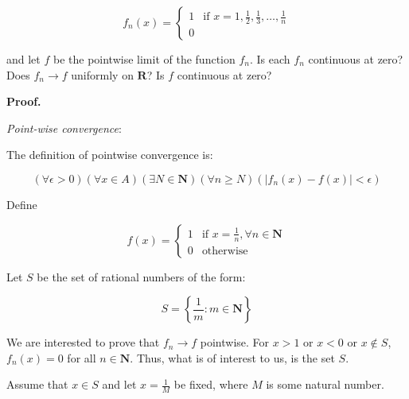 \documentclass[10pt]{article}
\begin{document}
\begin{equation*}
f_{n}( x) =\begin{cases}
1 & \text{if } x=1,\frac{1}{2} ,\frac{1}{3} ,\dotsc ,\frac{1}{n}\\
0 & 
\end{cases}
\end{equation*}


and let $\displaystyle f$ be the pointwise limit of the function $\displaystyle f_{n}$. Is each $\displaystyle f_{n}$ continuous at zero? Does $\displaystyle f_{n}\rightarrow f$ uniformly on $\displaystyle \mathbf{R}$? Is $\displaystyle f$ continuous at zero?



\textbf{Proof.}



\textit{Point-wise convergence}:



The definition of pointwise convergence is:


\begin{equation*}
( \forall \epsilon  >0)( \forall x\in A)( \exists N\in \mathbf{N})( \forall n\geq N)( |f_{n}( x) -f( x) |< \epsilon )
\end{equation*}


Define 


\begin{equation*}
f( x) =\begin{cases}
1 & \text{if } x=\frac{1}{n} ,\forall n\in \mathbf{N}\\
0 & \text{otherwise}
\end{cases}
\end{equation*}


Let $\displaystyle S$ be the set of rational numbers of the form:


\begin{equation*}
S=\left\{\frac{1}{m} :m\in \mathbf{N}\right\}
\end{equation*}


We are interested to prove that $\displaystyle f_{n}\rightarrow f$ pointwise. For $\displaystyle x >1$ or $\displaystyle x< 0$ or $\displaystyle x\notin S$, $\displaystyle f_{n}( x) =0$ for all $\displaystyle n\in \mathbf{N}$. Thus, what is of interest to us, is the set $\displaystyle S$. 



Assume that $\displaystyle x\in S$ and let $\displaystyle x=\frac{1}{M}$ be fixed, where $\displaystyle M$ is some natural number.
\end{document}
